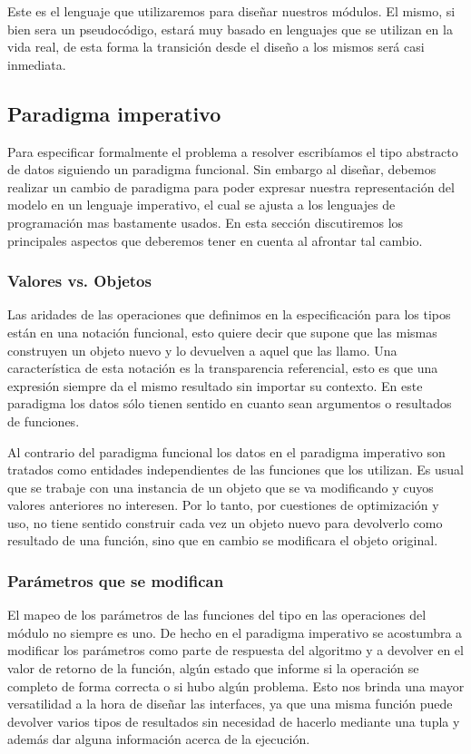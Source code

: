 \documentclass[10pt, a4paper]{report}
\begin{document}
Este es el lenguaje que utilizaremos para dise\~nar nuestros m\'odulos. El mismo, si bien sera un pseudoc\'odigo, estar\'a muy basado en lenguajes que se utilizan en la vida real, de esta forma la transici\'on desde el dise\~no a los mismos ser\'a casi inmediata.

\subsection{Paradigma imperativo}

Para especificar formalmente el problema a resolver escrib\'iamos el tipo abstracto de datos siguiendo un paradigma funcional. Sin embargo al dise\~nar, debemos realizar un cambio de paradigma para poder expresar nuestra representaci\'on del modelo en un lenguaje imperativo, el cual se ajusta a los lenguajes de programaci\'on mas bastamente usados. En esta secci\'on discutiremos los principales aspectos que deberemos tener en cuenta al afrontar tal cambio.

\subsubsection*{Valores vs. Objetos}

Las aridades de las operaciones que definimos en la especificaci\'on para los tipos est\'an en una notaci\'on funcional, esto quiere decir que supone que las mismas construyen un objeto nuevo y lo devuelven a aquel que las llamo. Una caracter\'istica de esta notaci\'on es la transparencia referencial, esto es que una expresi\'on siempre da el mismo resultado sin importar su contexto. En este paradigma los datos s\'olo tienen sentido en cuanto sean argumentos o resultados de funciones.

Al contrario del paradigma funcional los datos en el paradigma imperativo son tratados como entidades independientes de las funciones que los utilizan. Es usual que se trabaje con una instancia de un objeto que se va modificando y cuyos valores anteriores no interesen. Por lo tanto, por cuestiones de optimizaci\'on y uso, no tiene sentido construir cada vez un objeto nuevo para devolverlo como resultado de una funci\'on, sino que en cambio se modificara el objeto original.

\subsubsection*{Par\'ametros que se modifican}

El mapeo de los par\'ametros de las funciones del tipo en las operaciones del m\'odulo no siempre es uno. De hecho en el paradigma imperativo se acostumbra a modificar los par\'ametros como parte de respuesta del algoritmo y a devolver en el valor de retorno de la funci\'on, alg\'un estado que informe si la operaci\'on se completo de forma correcta o si hubo alg\'un problema. Esto nos brinda una mayor versatilidad a la hora de dise\~nar las interfaces, ya que una misma funci\'on puede devolver varios tipos de resultados sin necesidad de hacerlo mediante una tupla y adem\'as dar alguna informaci\'on acerca de la ejecuci\'on.
\end{document}
